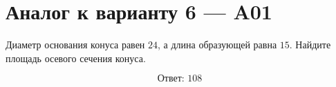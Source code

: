 \documentclass[12pt,a4paper]{article}
\begin{document}
\section*{Аналог к варианту 6 — A01}

Диаметр основания конуса равен \(24\), а длина образующей равна \(15\). Найдите площадь осевого сечения конуса.

\begin{center}
\end{center}

\[
\boxed{\text{Ответ: }108}
\]
\end{document}
